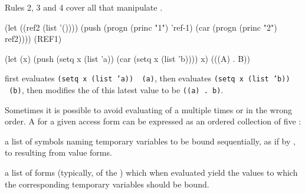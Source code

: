 \endlist
Rules 2, 3 and 4 cover all   that manipulate .


\code
 (let ((ref2 (list '())))
   (push (progn (princ "1") 'ref-1)
         (car (progn (princ "2") ref2)))) 
\EV (REF1)

 (let (x)
    (push (setq x (list 'a))
          (car (setq x (list 'b))))
     x)
\EV (((A) . B))
\endcode

 first evaluates {\tt (setq x (list 'a)) \EV\ (a)},
 then evaluates {\tt (setq x (list 'b)) \EV\ (b)},
 then modifies the  of this latest value to be {\tt ((a) . b)}.

\endsubsubsubsection%

\endsubsubsection%



Sometimes it is possible to avoid evaluating  of a 
 multiple times or in the wrong order.  A
for a given access form can be expressed as an ordered collection of five :


\beginlist

a list of symbols naming temporary variables to be bound
sequentially, as if by , to  
resulting from value forms.
     

a list of forms (typically,  of the
) which when evaluated 
yield the values to which the corresponding temporary 
variables should be bound.


